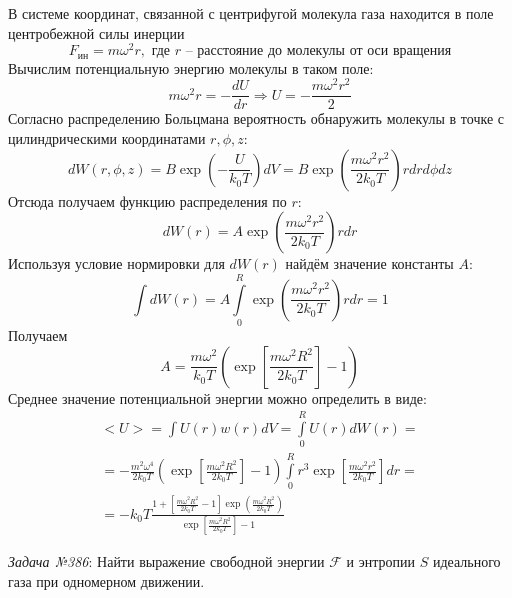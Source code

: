 \documentclass[14pt,final,titlepage,pscyr]{hedwork}
\begin{document}
В системе координат, связанной с центрифугой молекула газа находится в поле 
центробежной силы инерции
\[
	F_\text{ин} = m\omega^2 r, \text{ где } r \text{ -- расстояние до 
		молекулы от оси вращения}
\]
Вычислим потенциальную энергию молекулы в таком поле:
\[
	m\omega^2 r = -\frac{dU}{dr} \Rightarrow 
	U = -\frac{m\omega^2 r^2}{2}
\]
Согласно распределению Больцмана вероятность обнаружить молекулы в точке с 
цилиндрическими координатами \( r, \phi, z \):
\[
	dW(r,\phi,z) = B\exp\left(-\frac{U}{k_0 T}\right) dV = B
		\exp\left(\frac{m\omega^2 r^2}{2k_0 T}\right) r dr d\phi dz
\]
Отсюда получаем функцию распределения по \( r \):
\[
	dW(r) = A\exp\left(\frac{m\omega^2 r^2}{2k_0 T}\right) r dr
\]
Используя условие нормировки для \( dW(r) \) найдём значение константы \( A \):
\[
	\int dW(r) = A\int\limits_{0}^{R} 
		\exp\left( \frac{m\omega^2 r^2}{2k_0 T} \right) r dr = 1
\]
Получаем
\[
	A = \frac{m\omega^2}{k_0 T}\left( 
		\exp\left[\frac{m\omega^2 R^2}{2k_0 T}\right] - 1 \right)
\]
Среднее значение потенциальной энергии можно определить в виде:
\begin{gather}
	<U> = \int U(r) w(r) dV = \int\limits_{0}^{R} U(r) dW(r) = 
	\nonumber \\ =
		-\frac{m^2 \omega^4}{2k_0 T}\left( 
		\exp\left[\frac{m\omega^2 R^2}{2k_0 T}\right] - 1 \right)
		\int\limits_{0}^{R} r^3 \exp\left[ 
		\frac{m\omega^2 r^2}{2k_0 T} \right] dr = \nonumber \\ =
		-k_0 T \frac{1 + 
			\left[\frac{m\omega^2 R^2}{2k_0 T} - 1 \right]
			\exp\left( \frac{m\omega^2 R^2}{2k_0 T} \right)}
			{\exp\left[\frac{m\omega^2 R^2}{2k_0 T}\right] - 1}
	\nonumber
\end{gather}
\newpage

\emph{Задача №386}: Найти выражение свободной энергии \( \mathcal{F} \) и 
энтропии \( S \) идеального газа при одномерном движении.
\end{document}

